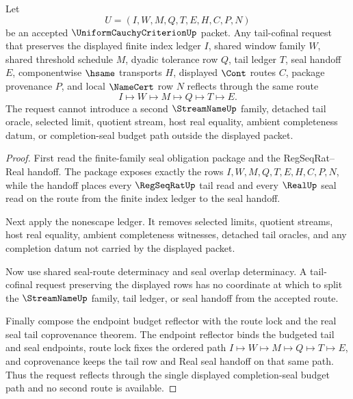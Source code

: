 \begin{theorem}
\label{thm:uniform-cauchy-criterion-finite-family-tail-cofinal-seal-reflector}
Let
$$
U=(I,W,M,Q,T,E,H,C,P,N)
$$
be an accepted $\UniformCauchyCriterionUp$ packet. Any tail-cofinal request that preserves the displayed finite index ledger $I$, shared window family $W$, shared threshold schedule $M$, dyadic tolerance row $Q$, tail ledger $T$, seal handoff $E$, componentwise $\hsame$ transports $H$, displayed $\Cont$ routes $C$, package provenance $P$, and local $\NameCert$ row $N$ reflects through the same route
$$
I \longmapsto W \longmapsto M \longmapsto Q \longmapsto T \longmapsto E.
$$
The request cannot introduce a second $\StreamNameUp$ family, detached tail oracle, selected limit, quotient stream, host real equality, ambient completeness datum, or completion-seal budget path outside the displayed packet.
\end{theorem}
\begin{proof}
First read the finite-family seal obligation package and the RegSeqRat--Real handoff. The package exposes exactly the rows $I,W,M,Q,T,E,H,C,P,N$, while the handoff places every $\RegSeqRatUp$ tail read and every $\RealUp$ seal read on the route from the finite index ledger to the seal handoff.

Next apply the nonescape ledger. It removes selected limits, quotient streams, host real equality, ambient completeness witnesses, detached tail oracles, and any completion datum not carried by the displayed packet.

Now use shared seal-route determinacy and seal overlap determinacy. A tail-cofinal request preserving the displayed rows has no coordinate at which to split the $\StreamNameUp$ family, tail ledger, or seal handoff from the accepted route.

Finally compose the endpoint budget reflector with the route lock and the real seal tail coprovenance theorem. The endpoint reflector binds the budgeted tail and seal endpoints, route lock fixes the ordered path $I \longmapsto W \longmapsto M \longmapsto Q \longmapsto T \longmapsto E$, and coprovenance keeps the tail row and Real seal handoff on that same path. Thus the request reflects through the single displayed completion-seal budget path and no second route is available.
\end{proof}

